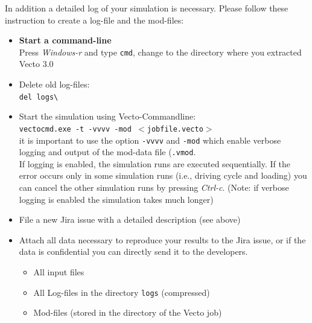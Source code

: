 In addition a detailed log of your simulation is necessary. Please follow these instruction to create a log-file and the mod-files:

\begin{itemize}
	\item \textbf{Start a command-line}\\
		Press \textit{Windows-r} and type \texttt{cmd}, change to the directory where you extracted Vecto 3.0
	\item Delete old log-files:\\
		\texttt{del logs\textbackslash*}
	\item Start the simulation using Vecto-Commandline: \\
		\texttt{vectocmd.exe -t -vvvv -mod $<$jobfile.vecto$>$} \\
		it is important to use  the option \texttt{-vvvv} and \texttt{-mod} which enable verbose logging and output of the mod-data file (\texttt{.vmod}. \\[0.5em]
		If logging is enabled, the simulation runs are executed sequentially. If the error occurs only in some simulation runs (i.e., driving cycle and loading) you can cancel the other simulation runs by pressing \textit{Ctrl-c}. (Note: if verbose logging is enabled the simulation takes much longer)
	\item File a new Jira issue with a detailed description (see above)
	\item Attach all data necessary to reproduce your results to the Jira issue, or if the data is confidential you can directly send it to the developers.
	\begin{itemize}
		\item All input files
		\item All Log-files in the directory \texttt{logs} (compressed)
		\item Mod-files (stored in the directory of the Vecto job)
	\end{itemize}
\end{itemize}




